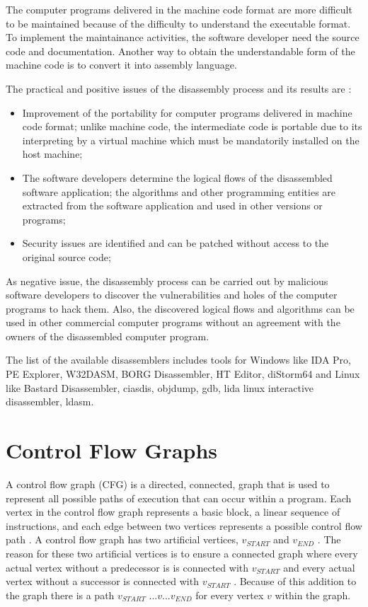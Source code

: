 The computer programs delivered in the machine code format are more difficult to be maintained because of the difficulty to understand the executable format. To implement the maintainance activities, the software developer need the source code and documentation. Another way to obtain the understandable form of the machine code is to convert it into assembly language.

The practical and positive issues of the disassembly process and its results are :

\begin{itemize}
	\item Improvement of the portability for computer programs delivered in machine code format; unlike machine code, the intermediate code is portable due to its interpreting by a virtual machine which must be mandatorily installed on the host machine;
	\item The software developers determine the logical flows of the disassembled software application; the algorithms and other programming entities are extracted from the software application and used in other versions or programs;
	\item Security issues are identified and can be patched without access to the original source code;
\end{itemize}

As negative issue, the disassembly process can be carried out by malicious software developers to discover the vulnerabilities and holes of the computer programs to hack them. Also, the discovered logical flows and algorithms can be used in other commercial computer programs without an agreement with the owners of the disassembled computer program.

The list of the available disassemblers includes tools for Windows like IDA Pro, PE Explorer, W32DASM, BORG Disassembler, HT Editor, diStorm64 and Linux like Bastard Disassembler, ciasdis, objdump, gdb, lida linux interactive disassembler, ldasm.

\section{Control Flow Graphs}

A control flow graph (CFG) is a directed, connected, graph that is used to represent all possible paths of execution that can occur within a program. Each vertex in the control flow graph represents a basic block, a linear sequence of instructions, and each edge between two vertices represents a possible control flow path \cite{Allen}. A control flow graph has two artificial vertices, $v_{START}$ and $v_{END}$ . The reason for these two artificial vertices is to ensure a connected graph where every actual vertex without a predecessor is is connected with $v_{START}$ and every actual vertex without a successor is connected with $v_{START}$ . Because of this addition to the graph there is a path $v_{START}$ ...$v$...$v_{END}$ for every vertex $v$ within the graph.

